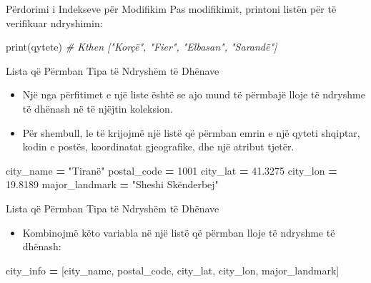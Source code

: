 \documentclass[
  ignorenonframetext,
]{beamer}
\newenvironment{Shaded}{\begin{snugshade}}{\end{snugshade}}
\newcommand{\BuiltInTok}[1]{#1}
\newcommand{\CommentTok}[1]{\textcolor[rgb]{0.56,0.35,0.01}{\textit{#1}}}
\newcommand{\DecValTok}[1]{\textcolor[rgb]{0.00,0.00,0.81}{#1}}
\newcommand{\FloatTok}[1]{\textcolor[rgb]{0.00,0.00,0.81}{#1}}
\newcommand{\NormalTok}[1]{#1}
\newcommand{\OperatorTok}[1]{\textcolor[rgb]{0.81,0.36,0.00}{\textbf{#1}}}
\newcommand{\StringTok}[1]{\textcolor[rgb]{0.31,0.60,0.02}{#1}}
\providecommand{\tightlist}{%
  \setlength{\itemsep}{0pt}\setlength{\parskip}{0pt}}
\begin{document}
\begin{frame}[fragile]{Përdorimi i Indekseve për Modifikim}
\protect\hypertarget{puxebrdorimi-i-indekseve-puxebr-modifikim-3}{}
Pas modifikimit, printoni listën për të verifikuar ndryshimin:

\begin{Shaded}
\begin{Highlighting}[]
\BuiltInTok{print}\NormalTok{(qytete)  }\CommentTok{\# Kthen ["Korçë", "Fier", "Elbasan", "Sarandë"]}
\end{Highlighting}
\end{Shaded}
\end{frame}

\begin{frame}[fragile]{Lista që Përmban Tipa të Ndryshëm të Dhënave}
\protect\hypertarget{lista-quxeb-puxebrmban-tipa-tuxeb-ndryshuxebm-tuxeb-dhuxebnave}{}
\begin{itemize}
\item
  Një nga përfitimet e një liste është se ajo mund të përmbajë lloje të
  ndryshme të dhënash në të njëjtin koleksion.
\item
  Për shembull, le të krijojmë një listë që përmban emrin e një qyteti
  shqiptar, kodin e postës, koordinatat gjeografike, dhe një atribut
  tjetër.
\end{itemize}

\begin{Shaded}
\begin{Highlighting}[]
\NormalTok{  city\_name }\OperatorTok{=} \StringTok{"Tiranë"}
\NormalTok{  postal\_code }\OperatorTok{=} \DecValTok{1001}
\NormalTok{  city\_lat }\OperatorTok{=} \FloatTok{41.3275}
\NormalTok{  city\_lon }\OperatorTok{=} \FloatTok{19.8189}
\NormalTok{  major\_landmark }\OperatorTok{=} \StringTok{"Sheshi Skënderbej"}
\end{Highlighting}
\end{Shaded}
\end{frame}

\begin{frame}[fragile]{Lista që Përmban Tipa të Ndryshëm të Dhënave}
\protect\hypertarget{lista-quxeb-puxebrmban-tipa-tuxeb-ndryshuxebm-tuxeb-dhuxebnave-1}{}
\begin{itemize}
\tightlist
\item
  Kombinojmë këto variabla në një listë që përmban lloje të ndryshme të
  dhënash:
\end{itemize}

\begin{Shaded}
\begin{Highlighting}[]
\NormalTok{city\_info }\OperatorTok{=}\NormalTok{ [city\_name, postal\_code, city\_lat, city\_lon, major\_landmark]}
\end{Highlighting}
\end{Shaded}
\end{frame}
\end{document}
